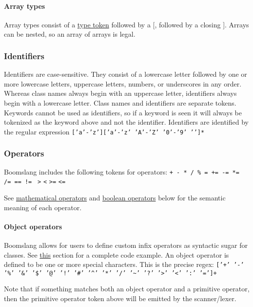 \documentclass{article}
\begin{document}
\paragraph{Array types}
Array types consist of a \hyperref[sec:typenames]{type token} followed by a [, followed by a closing ]. Arrays can be nested, so an array of arrays is legal.

\subsubsection{Identifiers}
Identifiers are case-sensitive. They consist of a lowercase letter followed by one or more lowercase letters, uppercase letters, numbers, or underscores in any order. Whereas class names always begin with an uppercase letter, identifiers always begin with a lowercase letter. Class names and identifiers are separate tokens. Keywords cannot be used as identifiers, so if a keyword is seen it will always be tokenized as the keyword above and not the identifier. Identifiers are identified by the regular expression \texttt{['a'-'z']['a'-'z' 'A'-'Z' '0'-'9' '\textunderscore']*}

\subsubsection{Operators}
Boomslang includes the following tokens for operators: \texttt{+ - * / \% = += -= *= /= == != } \texttt{>} \texttt{<} \texttt{>=} \texttt{<=}

See \hyperref[sec:expr-mathematical-operators]{mathematical operators} and \hyperref[sec:expr-boolean-operators]{boolean operators} below for the semantic meaning of each operator.

\paragraph{Object operators}
Boomslang allows for users to define custom infix operators as syntactic sugar for classes. See \hyperref[sec:object-operators]{this} section for a complete code example. An object operator is defined to be one or more special characters. This is the precise regex: \texttt{['+' '-' '\%' '\&' '\$' '@' '!' '\#' '\^{}' '*' '/' '\~{}' '?' '}\texttt{>}\texttt{' '}\texttt{<}\texttt{'}\texttt{ ':' '=']+}

Note that if something matches both an object operator and a primitive operator, then the primitive operator token above will be emitted by the scanner/lexer.
\end{document}
